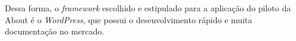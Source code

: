 Dessa forma, o \textit{framework} escolhido e estipulado para a aplicação do
piloto da About é o \textit{WordPress}, que possui o desenvolvimento rápido e
muita documentação no mercado.

%

